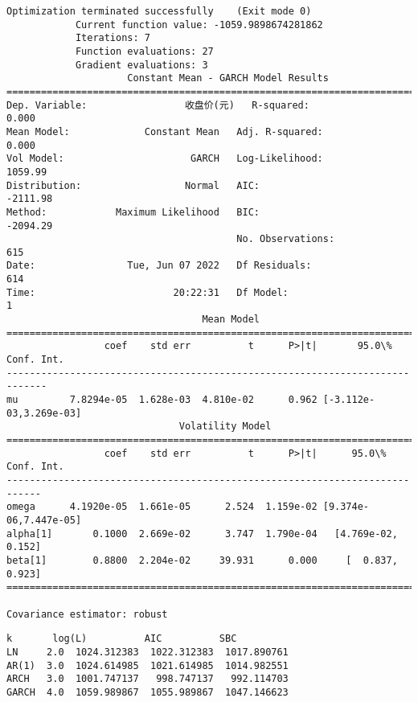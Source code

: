 \documentclass[11pt]{article}
\makeatletter
\newcommand{\boxspacing}{\kern\kvtcb@left@rule\kern\kvtcb@boxsep}
\newcommand{\prompt}[4]{
        {\ttfamily\llap{{\color{#2}[#3]:\hspace{3pt}#4}}\vspace{-\baselineskip}}
    }
\makeatother
\begin{document}
    \begin{Verbatim}[commandchars=\\\{\}]
Optimization terminated successfully    (Exit mode 0)
            Current function value: -1059.9898674281862
            Iterations: 7
            Function evaluations: 27
            Gradient evaluations: 3
                     Constant Mean - GARCH Model Results
==============================================================================
Dep. Variable:                 收盘价(元)   R-squared:                       0.000
Mean Model:             Constant Mean   Adj. R-squared:                  0.000
Vol Model:                      GARCH   Log-Likelihood:                1059.99
Distribution:                  Normal   AIC:                          -2111.98
Method:            Maximum Likelihood   BIC:                          -2094.29
                                        No. Observations:                  615
Date:                Tue, Jun 07 2022   Df Residuals:                      614
Time:                        20:22:31   Df Model:                            1
                                  Mean Model
=============================================================================
                 coef    std err          t      P>|t|       95.0\% Conf. Int.
-----------------------------------------------------------------------------
mu         7.8294e-05  1.628e-03  4.810e-02      0.962 [-3.112e-03,3.269e-03]
                              Volatility Model
============================================================================
                 coef    std err          t      P>|t|      95.0\% Conf. Int.
----------------------------------------------------------------------------
omega      4.1920e-05  1.661e-05      2.524  1.159e-02 [9.374e-06,7.447e-05]
alpha[1]       0.1000  2.669e-02      3.747  1.790e-04   [4.769e-02,  0.152]
beta[1]        0.8800  2.204e-02     39.931      0.000     [  0.837,  0.923]
============================================================================

Covariance estimator: robust
    \end{Verbatim}

            \begin{tcolorbox}[breakable, size=fbox, boxrule=.5pt, pad at break*=1mm, opacityfill=0]
\prompt{Out}{outcolor}{17}{\boxspacing}
\begin{Verbatim}[commandchars=\\\{\}]
         k       log(L)          AIC          SBC
LN     2.0  1024.312383  1022.312383  1017.890761
AR(1)  3.0  1024.614985  1021.614985  1014.982551
ARCH   3.0  1001.747137   998.747137   992.114703
GARCH  4.0  1059.989867  1055.989867  1047.146623
\end{Verbatim}
\end{tcolorbox}
        
\end{document}
